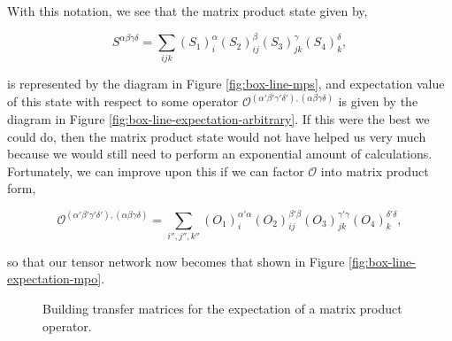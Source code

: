 \documentclass[12pt]{amsbook}
\theoremstyle{plain}
\theoremstyle{definition}
\theoremstyle{remark}
\newcommand{\paren}[1]{\left(#1\right)}
\begin{document}
With this notation, we see that the matrix product state given by,

$$S^{\alpha\beta\gamma\delta} = \sum_{ijk} \paren{S_1}_{i}^\alpha\paren{S_2}_{ij}^\beta\paren{S_3}_{jk}^\gamma\paren{S_4}_{k}^\delta,$$

\noindent is represented by the diagram in Figure \ref{fig:box-line-mps},  and expectation value of this state with respect to some operator $\mathscr{O}^{(\alpha'\beta'\gamma'\delta'),(\alpha\beta\gamma\delta)}$ is given by the diagram in Figure \ref{fig:box-line-expectation-arbitrary}.  If this were the best we could do, then the matrix product state would not have helped us very much because we would still need to perform an exponential amount of calculations.  Fortunately, we can improve upon this if we can factor $\mathscr{O}$ into matrix product form,

$$\mathscr{O}^{(\alpha'\beta'\gamma'\delta'),(\alpha\beta\gamma\delta)}
  = \sum_{i'',j'',k''}\paren{O_1}^{\alpha'\alpha}_i\paren{O_2}^{\beta'\beta}_{ij}\paren{O_3}^{\gamma'\gamma}_{jk}\paren{O_4}^{\delta'\delta}_k,
$$

\noindent so that our tensor network now becomes that shown in Figure \ref{fig:box-line-expectation-mpo}.

\begin{figure}
\caption{Building transfer matrices for the expectation of a matrix product operator.}
\label{fig:formation-of-transfer-matrices}
\end{figure}
\end{document}
